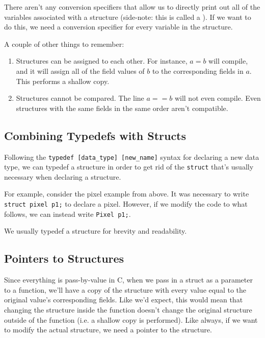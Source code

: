 There aren't any conversion specifiers that allow us to directly print out all of the variables associated with a structure (side-note: this is called a ). If we want to do this, we need a conversion specifier for every variable in the structure.  


A couple of other things to remember: \begin{enumerate}
    \item Structures can be assigned to each other. For instance, $a = b$ will compile, and it will assign all of the field values of $b$ to the corresponding fields in $a$. This performs a shallow copy. 
    \item Structures cannot be compared. The line $a == b$ will not even compile. Even structures with the same fields in the same order aren't compatible.
\end{enumerate}

\subsection{Combining Typedefs with Structs}

Following the \verb!typedef [data_type] [new_name]! syntax for declaring a new data type, we can typedef a structure in order to get rid of the \verb!struct! that's usually necessary when declaring a structure. 

For example, consider the pixel example from above. It was necessary to write \verb!struct pixel p1;! to declare a pixel. However, if we modify the code to what follows, we can instead write \verb!Pixel p1;!.  \\


\lstset{
caption=Typedef'ing a Structure
}
\begin{center}
\label{Typedef and Structure}
\end{center}

We usually typedef a structure for brevity and readability.  


\subsection{Pointers to Structures}
Since everything is pass-by-value in C, when we pass in a struct as a parameter to a function, we'll have a copy of the structure with every value equal to the original value's corresponding fields. Like we'd expect, this would mean that changing the structure inside the function doesn't change the original structure outside of the function (i.e. a shallow copy is performed). Like always, if we want to modify the actual structure, we need a pointer to the structure. \\


